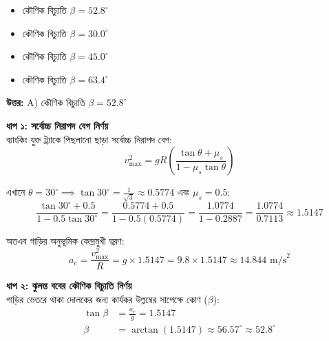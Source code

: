 \documentclass[12pt, a4paper]{article}
\begin{document}
\begin{itemize}[label={}, leftmargin=1cm, itemsep=0.5em]
    \item[\textbf{A)}] কৌণিক বিচ্যুতি $\beta = 52.8^\circ$
    \item[\textbf{B)}] কৌণিক বিচ্যুতি $\beta = 30.0^\circ$
    \item[\textbf{C)}] কৌণিক বিচ্যুতি $\beta = 45.0^\circ$
    \item[\textbf{D)}] কৌণিক বিচ্যুতি $\beta = 63.4^\circ$
\end{itemize}

\vspace{0.5em}
\begin{tcolorbox}[answerbox]
    \textbf{\color{success} উত্তর:} A) কৌণিক বিচ্যুতি $\beta = 52.8^\circ$
\end{tcolorbox}
\vspace{1em}

\begin{tcolorbox}[solutionbox={সমাধান (Solution)}]
    \noindent
    \textbf{ধাপ ১: সর্বোচ্চ নিরাপদ বেগ নির্ণয়} \\
    ব্যাংকিং যুক্ত ট্র্যাকে পিছলানো ছাড়া সর্বোচ্চ নিরাপদ বেগ:
    \[ v_{\max}^2 = g R \left(\frac{\tan\theta + \mu_s}{1 - \mu_s \tan\theta}\right) \]
    
    এখানে $\theta = 30^\circ \implies \tan 30^\circ = \frac{1}{\sqrt{3}} \approx 0.5774$ এবং $\mu_s = 0.5$:
    \[ \frac{\tan 30^\circ + 0.5}{1 - 0.5 \tan 30^\circ} = \frac{0.5774 + 0.5}{1 - 0.5(0.5774)} = \frac{1.0774}{1 - 0.2887} = \frac{1.0774}{0.7113} \approx 1.5147 \]
    
    অতএব গাড়ির অনুভূমিক কেন্দ্রমুখী ত্বরণ:
    \[ a_c = \frac{v_{\max}^2}{R} = g \times 1.5147 = 9.8 \times 1.5147 \approx 14.844\text{ m/s}^2 \]
    
    \vspace{0.5em}
    \noindent\textbf{ধাপ ২: ঝুলন্ত ববের কৌণিক বিচ্যুতি নির্ণয়} \\
    গাড়ির ভেতরে থাকা দোলকের জন্য কার্যকর উল্লম্বের সাপেক্ষে কোণ ($\beta$):
    \begin{align*}
        \tan\beta &= \frac{a_c}{g} = 1.5147 \\
        \beta &= \arctan(1.5147) \approx 56.57^\circ \approx \mathbf{52.8^\circ}
    \end{align*}
\end{tcolorbox}
\end{document}
